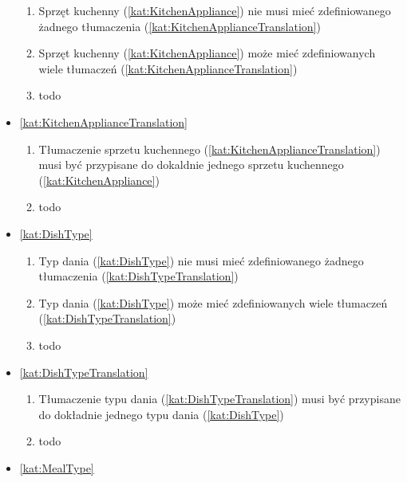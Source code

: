 \begin{itemize}[label={\textbf{Reguły dla}}, wide, labelwidth=!, labelindent=0pt]
\begin{enumerate}[label={\textbf{REG/\protect\threedigits{\arabic{enumi}}}}, wide, labelwidth=!, align=left, leftmargin=3cm, resume]
        \item Sprzęt kuchenny (\ref{kat:KitchenAppliance}) nie musi mieć zdefiniowanego żadnego tłumaczenia (\ref{kat:KitchenApplianceTranslation})
        \item Sprzęt kuchenny (\ref{kat:KitchenAppliance}) może mieć zdefiniowanych wiele tłumaczeń (\ref{kat:KitchenApplianceTranslation})
        \item todo
    \end{enumerate}
    \item\ref{kat:KitchenApplianceTranslation}
    \begin{enumerate}[label={\textbf{REG/\protect\threedigits{\arabic{enumi}}}}, wide, labelwidth=!, align=left, leftmargin=3cm, resume]
        \item Tłumaczenie sprzetu kuchennego (\ref{kat:KitchenApplianceTranslation}) musi być przypisane do dokaldnie jednego sprzetu kuchennego (\ref{kat:KitchenAppliance})
        \item todo
    \end{enumerate}
    \item\ref{kat:DishType}
    \begin{enumerate}[label={\textbf{REG/\protect\threedigits{\arabic{enumi}}}}, wide, labelwidth=!, align=left, leftmargin=3cm, resume]
        \item Typ dania (\ref{kat:DishType}) nie musi mieć zdefiniowanego żadnego tłumaczenia (\ref{kat:DishTypeTranslation})
        \item Typ dania (\ref{kat:DishType}) może mieć zdefiniowanych wiele tłumaczeń (\ref{kat:DishTypeTranslation})
        \item todo
    \end{enumerate}
    \item\ref{kat:DishTypeTranslation}
    \begin{enumerate}[label={\textbf{REG/\protect\threedigits{\arabic{enumi}}}}, wide, labelwidth=!, align=left, leftmargin=3cm, resume]
        \item Tłumaczenie typu dania (\ref{kat:DishTypeTranslation}) musi być przypisane do dokładnie jednego typu dania (\ref{kat:DishType})
        \item todo
    \end{enumerate}
    \item\ref{kat:MealType}
    \begin{enumerate}[label={\textbf{REG/\protect\threedigits{\arabic{enumi}}}}, wide, labelwidth=!, align=left, leftmargin=3cm, resume]

\end{enumerate}
\end{itemize}
